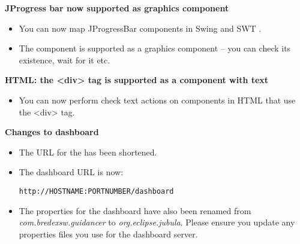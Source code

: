 \textbf{JProgress bar now supported as graphics component}
\begin{itemize}
\item You can now map JProgressBar components in Swing and SWT \gdauts{}.
\item The component is supported as a graphics component -- you can check its existence, wait for it etc.
\end{itemize}

\textbf{HTML: the <div> tag is supported as a component with text}
\begin{itemize}
\item You can now perform check text actions on components in HTML \gdauts{} that use the <div> tag.
\end{itemize}

\textbf{Changes to dashboard}
\begin{itemize}
\item The URL for the \dash{} has been shortened. 
\item The dashboard URL is now:
\begin{verbatim}
http://HOSTNAME:PORTNUMBER/dashboard
\end{verbatim}
\item The properties for the dashboard have also been renamed from \textit{com.bredexsw.guidancer} to \textit{org.eclipse.jubula}. Please ensure you update any properties files you use for the dashboard server.
\end{itemize}
